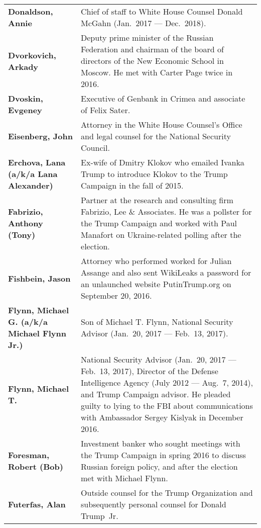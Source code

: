 \begin{longtable}{ p{} p{} }
    \textbf{Donaldson, Annie} & Chief of staff to White House Counsel Donald McGahn (Jan.~2017 — Dec.~2018). \\

    \textbf{Dvorkovich, Arkady} & Deputy prime minister of the Russian Federation and chairman of the board of directors of the New Economic School in Moscow. He met with Carter Page twice in 2016. \\

    \textbf{Dvoskin, Evgeney} & Executive of Genbank in Crimea and associate of Felix Sater. \\

    \textbf{Eisenberg, John} & Attorney in the White House Counsel's Office and legal counsel for the National Security Council. \\

    \textbf{Erchova, Lana (a/k/a Lana Alexander)} & Ex-wife of Dmitry Klokov who emailed Ivanka Trump to introduce Klokov to the Trump Campaign in the fall of 2015. \\

    \textbf{Fabrizio, Anthony (Tony)} & Partner at the research and consulting firm Fabrizio, Lee \& Associates. He was a pollster for the Trump Campaign and worked with Paul Manafort on Ukraine-related polling after the election. \\

    \textbf{Fishbein, Jason} & Attorney who performed worked for Julian Assange and also sent WikiLeaks a password for an unlaunched website PutinTrump.org on September 20, 2016. \\

    \textbf{Flynn, Michael G. (a/k/a Michael Flynn Jr.)} & Son of Michael T. Flynn, National Security Advisor (Jan.~20, 2017 — Feb.~13, 2017). \\

    \textbf{Flynn, Michael T.} & National Security Advisor (Jan.~20, 2017 — Feb.~13, 2017), Director of the Defense Intelligence Agency (July 2012 — Aug.~7, 2014), and Trump Campaign advisor. He pleaded guilty to lying to the FBI about communications with Ambassador Sergey Kislyak in December 2016. \\

    \textbf{Foresman, Robert (Bob)} & Investment banker who sought meetings with the Trump Campaign in spring 2016 to discuss Russian foreign policy, and after the election met with Michael Flynn. \\

    \textbf{Futerfas, Alan} & Outside counsel for the Trump Organization and subsequently personal counsel for Donald Trump~Jr. \\


\end{longtable}

